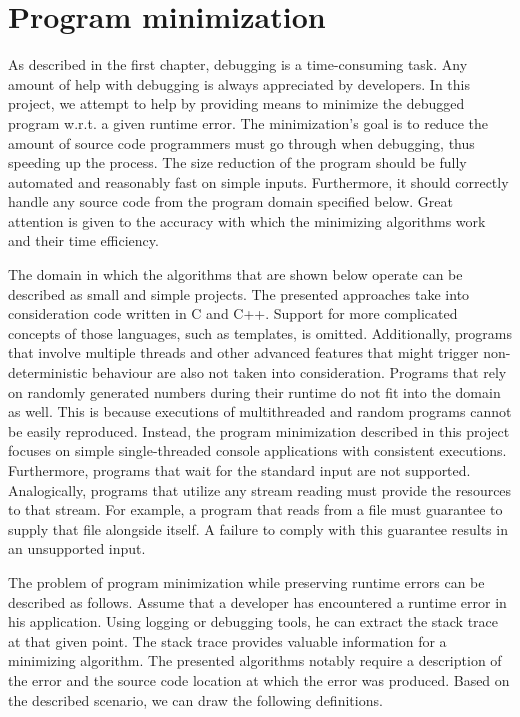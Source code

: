 \chapter{Program minimization}\label{chap:minimization}

As described in the first chapter, debugging is a time-consuming task.
Any amount of help with debugging is always appreciated by developers.
In this project, we attempt to help by providing means to minimize the 
debugged program w.r.t. a given runtime error.
The minimization's goal is to reduce the amount of source code programmers 
must go through when debugging, thus speeding up the process.
The size reduction of the program should be fully automated and reasonably 
fast on simple inputs.
Furthermore, it should correctly handle any source code from the program 
domain specified below.
Great attention is given to the accuracy with which the minimizing algorithms 
work and their time efficiency.

The domain in which the algorithms that are shown below operate can be 
described as small and simple projects.
The presented approaches take into consideration code written in C and C++.
Support for more complicated concepts of those languages, such as templates,
is omitted.
Additionally, programs that involve multiple threads and other advanced
features that might trigger non-deterministic behaviour are also not taken 
into consideration.
Programs that rely on randomly generated numbers during their runtime do not 
fit into the domain as well. 
This is because executions of multithreaded and random programs cannot be 
easily reproduced.
Instead, the program minimization described in this project focuses 
on simple single-threaded console applications with consistent executions.
Furthermore, programs that wait for the standard input are not supported. 
Analogically, programs that utilize any stream reading must provide 
the resources to that stream. 
For example, a program that reads from a file must guarantee to supply 
that file alongside itself. 
A failure to comply with this guarantee results in an unsupported input.

The problem of program minimization while preserving runtime errors can be 
described as follows.
Assume that a developer has encountered a runtime error in his application.
Using logging or debugging tools, he can extract the stack trace at that 
given point.
The stack trace provides valuable information for a minimizing algorithm.
The presented algorithms notably require a description of the error and 
the source code location at which the error was produced.
Based on the described scenario, we can draw the following definitions.

